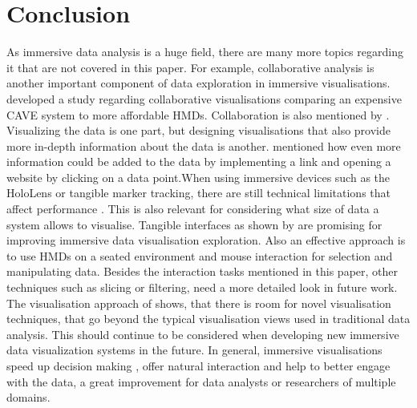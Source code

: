 \section{Conclusion}
As immersive data analysis is a huge field, there are many more 
topics regarding it that are not covered in this paper. For example, collaborative analysis is another important component of data exploration in immersive visualisations. \cite{Cordeil2017b} developed a study regarding collaborative visualisations comparing an expensive CAVE system to more affordable \ac{HMD}s. Collaboration is also mentioned by \cite{Cordeil2017b}.\newline
Visualizing the data is one part, but designing visualisations that also provide more in-depth information about the data is another. \cite[]{Donalek2015} mentioned how even more information could be added to the data by implementing a link and opening a website by clicking on a data point.\newline When using immersive devices such as the HoloLens or tangible marker tracking, there are still technical limitations that affect performance \autocite[]{Bach2018}. This is also relevant for considering what size of data a system allows to visualise. Tangible interfaces as shown by \cite{Bach2018} are promising for improving immersive data visualisation exploration. Also an effective approach is to use \ac{HMD}s on a seated environment and mouse interaction for selection and manipulating data. Besides the interaction tasks mentioned in this paper, other techniques such as slicing \autocite[]{Issartel2014} or filtering, need a more detailed look in future work.\newline
The visualisation approach of \cite{Cordeil2017a} shows, that there is room for novel visualisation techniques, that go beyond the typical visualisation views used in traditional data analysis. This should continue to be considered when developing new immersive data visualization systems in the future.
In general, immersive visualisations speed up decision making \autocite[]{Kwon2016}, offer natural interaction and help to better engage with the data, a great improvement for data analysts or researchers of multiple domains.